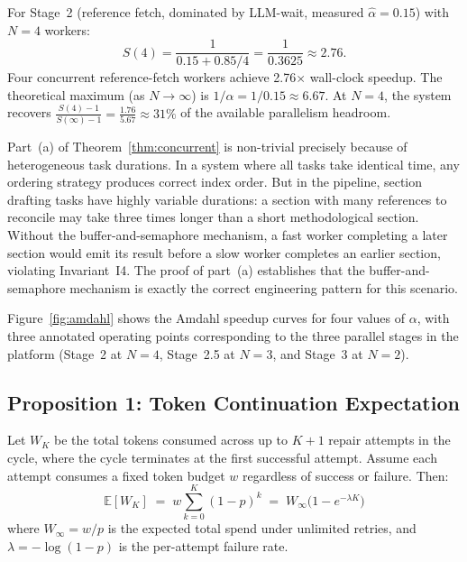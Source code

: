 \begin{corollary}
\label{cor:amdahl}
For Stage~2 (reference fetch, dominated by LLM-wait, measured $\hat{\alpha}=0.15$)
with $N=4$ workers:
\[
  S(4) = \frac{1}{0.15 + 0.85/4} = \frac{1}{0.3625} \approx 2.76.
\]
Four concurrent reference-fetch workers achieve 2.76$\times$ wall-clock speedup.
The theoretical maximum (as $N\to\infty$) is $1/\alpha = 1/0.15 \approx 6.67$.
At $N=4$, the system recovers $\frac{S(4)-1}{S(\infty)-1} = \frac{1.76}{5.67} \approx 31\%$
of the available parallelism headroom.
\end{corollary}

Part~(a) of Theorem~\ref{thm:concurrent} is non-trivial precisely because of
heterogeneous task durations.
In a system where all tasks take identical time, any ordering strategy produces correct
index order.
But in the \sys{} pipeline, section drafting tasks have highly variable durations:
a section with many references to reconcile may take three times longer than a short
methodological section.
Without the buffer-and-semaphore mechanism, a fast worker completing a later section
would emit its result before a slow worker completes an earlier section, violating
Invariant~I4.
The proof of part~(a) establishes that the buffer-and-semaphore mechanism is exactly
the correct engineering pattern for this scenario.

Figure~\ref{fig:amdahl} shows the Amdahl speedup curves for four values of $\alpha$,
with three annotated operating points corresponding to the three parallel stages in
the platform (Stage~2 at $N=4$, Stage~2.5 at $N=3$, and Stage~3 at $N=2$).



\subsection{Proposition 1: Token Continuation Expectation}

\begin{proposition}
\label{prop:token}
Let $W_K$ be the total tokens consumed across up to $K+1$ repair attempts in the \tvg{}
cycle, where the cycle terminates at the first successful attempt.
Assume each attempt consumes a fixed token budget $w$ regardless of success or failure.
Then:
\[
  \mathbb{E}[W_K] \;=\; w\sum_{k=0}^{K}(1-p)^k \;=\; W_\infty\bigl(1 - e^{-\lambda K}\bigr)
\]
where $W_\infty = w/p$ is the expected total spend under unlimited retries,
and $\lambda = -\log(1-p)$ is the per-attempt failure rate.
\end{proposition}

